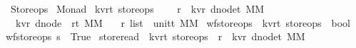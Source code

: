 %
\begin{isabellebody}%
%
%
\isadelimtheory
%
\endisadelimtheory
%
\isatagtheory
{}\isamarkupfalse%
\ Store{\isacharunderscore}ops\isanewline
{}\ Monad\isanewline
{}%
\endisatagtheory
{\isafoldtheory}%
%
\isadelimtheory
\isanewline
%
\endisadelimtheory
\isanewline
\isanewline
\isanewline
\isanewline
\isanewline
{}\isamarkupfalse%
\ {\isacharparenleft}{\isacharprime}k{\isacharcomma}{\isacharprime}v{\isacharcomma}{\isacharprime}r{\isacharcomma}{\isacharprime}t{\isacharparenright}\ store{\isacharunderscore}ops\ {\isacharequal}\ {\isachardoublequoteopen}\isanewline
\ \ {\isacharparenleft}{\isacharprime}r\ {\isasymRightarrow}\ {\isacharparenleft}{\isacharparenleft}{\isacharprime}k{\isacharcomma}{\isacharprime}v{\isacharcomma}{\isacharprime}r{\isacharparenright}\ dnode{\isacharcomma}{\isacharprime}t{\isacharparenright}\ MM{\isacharparenright}\ {\isacharasterisk}\isanewline
\ \ {\isacharparenleft}{\isacharparenleft}{\isacharprime}k{\isacharcomma}{\isacharprime}v{\isacharcomma}{\isacharprime}r{\isacharparenright}\ dnode\ {\isasymRightarrow}\ {\isacharparenleft}{\isacharprime}r{\isacharcomma}{\isacharprime}t{\isacharparenright}\ MM{\isacharparenright}\ {\isacharasterisk}\isanewline
\ \ {\isacharparenleft}{\isacharprime}r\ list\ {\isasymRightarrow}\ {\isacharparenleft}unit{\isacharcomma}{\isacharprime}t{\isacharparenright}\ MM{\isacharparenright}{\isachardoublequoteclose}\isanewline
\isanewline
{}\isamarkupfalse%
\ wf{\isacharunderscore}store{\isacharunderscore}ops\ {\isacharcolon}{\isacharcolon}\ {\isachardoublequoteopen}{\isacharparenleft}{\isacharprime}k{\isacharcomma}{\isacharprime}v{\isacharcomma}{\isacharprime}r{\isacharcomma}{\isacharprime}t{\isacharparenright}\ store{\isacharunderscore}ops\ {\isasymRightarrow}\ bool{\isachardoublequoteclose}\ \ \isanewline
{\isachardoublequoteopen}wf{\isacharunderscore}store{\isacharunderscore}ops\ s\ {\isacharequal}\ True{\isachardoublequoteclose}\isanewline
\isanewline
{}\isamarkupfalse%
\ store{\isacharunderscore}read\ {\isacharcolon}{\isacharcolon}\ {\isachardoublequoteopen}{\isacharparenleft}{\isacharprime}k{\isacharcomma}{\isacharprime}v{\isacharcomma}{\isacharprime}r{\isacharcomma}{\isacharprime}t{\isacharparenright}\ store{\isacharunderscore}ops\ {\isacharequal}{\isachargreater}\ {\isacharparenleft}{\isacharprime}r\ {\isasymRightarrow}\ {\isacharparenleft}{\isacharparenleft}{\isacharprime}k{\isacharcomma}{\isacharprime}v{\isacharcomma}{\isacharprime}r{\isacharparenright}\ dnode{\isacharcomma}{\isacharprime}t{\isacharparenright}\ MM{\isacharparenright}{\isachardoublequoteclose}\ \isanewline

\end{isabellebody}
